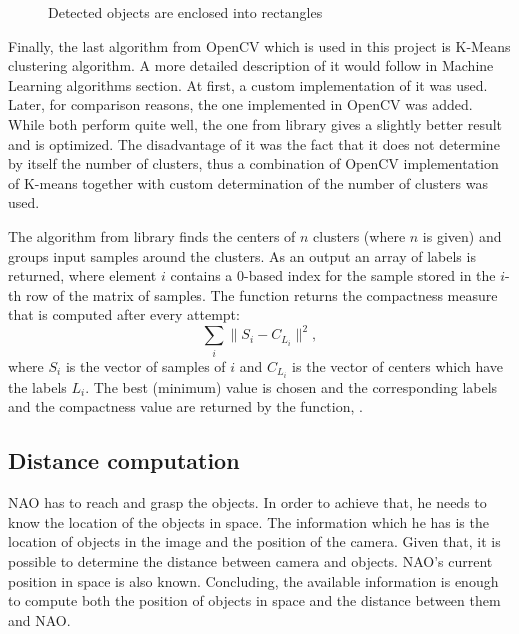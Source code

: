       \begin{figure}[t!]
        \centering
        \hfil 
        \caption{Detected objects are enclosed into rectangles}
        \label{rectangles}
      \end{figure}

      Finally, the last algorithm from OpenCV which is used in this project is K-Means clustering algorithm. A more detailed description of it would follow in Machine Learning algorithms section. At first, a custom implementation of it was used. Later, for comparison reasons, the one implemented in OpenCV was added. While both perform quite well, the one from library gives a slightly better result and is optimized. The disadvantage of it was the fact that it does not determine by itself the number of clusters, thus a combination of OpenCV implementation of K-means together with custom determination of the number of clusters was used. 

The algorithm from library finds the centers of \( n\) clusters (where \( n\) is given) and groups input samples around the clusters. As an output an array of labels is returned, where element \( i\) contains a 0-based index for the sample stored in the \(i\)-th row of the matrix of samples. The function returns the compactness measure that is computed after every attempt:
        \begin{equation}
        \label{sumsum}
          \sum_{i} \| S_{i} - C_{L_{i}} \|^{2},
        \end{equation}
      where \( S_{i}\) is the vector of samples of \( i \) and \( C_{L_{i}} \) is the vector of centers which have the labels \(L_{i} \). The best (minimum) value is chosen and the corresponding labels and the compactness value are returned by the function, \cite{opencv}.


    \subsection{Distance computation}

      NAO has to reach and grasp the objects. In order to achieve that, he needs to know the location of the objects in space. The information which he has is the location of objects in the image and the position of the camera. Given that, it is possible to determine the distance between camera and objects. NAO's current position in space is also known. Concluding, the available information is enough to compute both the position of objects in space and the distance between them and NAO. 

